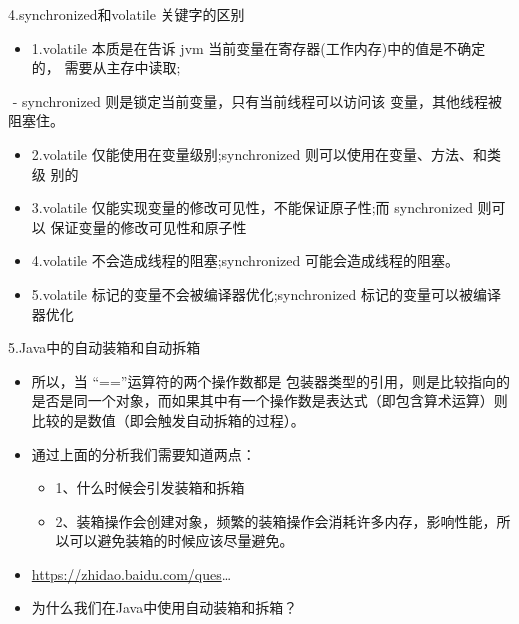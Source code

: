 \documentclass[9pt, b5paper]{article}
\begin{document}
4.synchronized和volatile 关键字的区别
\begin{itemize}
\item 1.volatile 本质是在告诉 jvm 当前变量在寄存器(工作内存)中的值是不确定的， 需要从主存中读取;
\end{itemize}
​  - synchronized 则是锁定当前变量，只有当前线程可以访问该 变量，其他线程被阻塞住。
\begin{itemize}
\item 2.volatile 仅能使用在变量级别;synchronized 则可以使用在变量、方法、和类级 别的
\item 3.volatile 仅能实现变量的修改可见性，不能保证原子性;而 synchronized 则可以 保证变量的修改可见性和原子性
\item 4.volatile 不会造成线程的阻塞;synchronized 可能会造成线程的阻塞。
\item 5.volatile 标记的变量不会被编译器优化;synchronized 标记的变量可以被编译器优化
\end{itemize}

5.Java中的自动装箱和自动拆箱
\begin{itemize}
\item 所以，当 “==”运算符的两个操作数都是 包装器类型的引用，则是比较指向的是否是同一个对象，而如果其中有一个操作数是表达式（即包含算术运算）则比较的是数值（即会触发自动拆箱的过程）。
\item 通过上面的分析我们需要知道两点：
\begin{itemize}
\item 1、什么时候会引发装箱和拆箱
\item 2、装箱操作会创建对象，频繁的装箱操作会消耗许多内存，影响性能，所以可以避免装箱的时候应该尽量避免。
\end{itemize}
\item \url{https://zhidao.baidu.com/ques}\ldots{}
\item 为什么我们在Java中使用自动装箱和拆箱？
\end{itemize}
\end{document}
